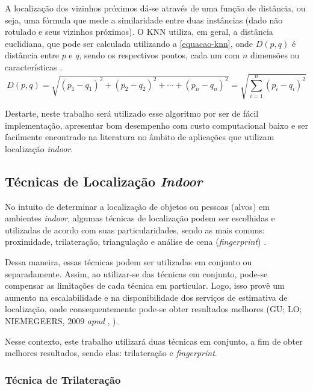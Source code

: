 \documentclass[12pt]{artigoifce}
\begin{document}
A localização dos vizinhos próximos dá-se através de uma função de distância, ou seja, uma fórmula que mede a similaridade entre duas instâncias (dado não rotulado e seus vizinhos próximos). O KNN utiliza, em geral, a distância euclidiana, que pode ser calculada utilizando a \autoref{equacao-knn}, onde $D(p,q)$ é distância entre $p$ e $q$, sendo os respectivos pontos, cada um com $n$ dimensões ou características \cite{tatsch2019}. 
\begin{equation}
    \label{equacao-knn}
    D(p,q) = \sqrt{(p_1-q_1)^2+(p_2-q_2)^2+\cdots+(p_n-q_n)^2} = \sqrt{\sum_{i=1}^{n} \left(p_i-q_i\right)^2}
\end{equation}

Destarte, neste trabalho será utilizado esse algoritmo por ser de fácil implementação, apresentar bom desempenho com custo computacional baixo e ser facilmente encontrado na literatura no âmbito de aplicações que utilizam localização \textit{indoor}. 

\subsection{Técnicas de Localização \textit{Indoor}}
\label{sec-fundamentacao-localizacao-indoor}

No intuito de determinar a localização de objetos ou pessoas (alvos) em ambientes \textit{indoor}, algumas técnicas de localização podem ser escolhidas e utilizadas de acordo com suas particularidades, sendo as mais comuns: proximidade, trilateração, triangulação e análise de cena (\textit{fingerprint}) \cite{berz2015, barros2016}.

Dessa maneira, essas técnicas podem ser utilizadas em conjunto ou separadamente. Assim, ao utilizar-se das técnicas em conjunto, pode-se compensar as limitações de cada técnica em particular. Logo, isso provê um aumento na escalabilidade e na disponibilidade dos serviços de estimativa de localização, onde consequentemente pode-se obter resultados melhores (GU; LO; NIEMEGEERS, 2009 \textit{apud} \citeauthor{reck2016}, \citeyear{reck2016}).  

Nesse contexto, este trabalho utilizará duas técnicas em conjunto, a fim de  obter melhores resultados, sendo elas: trilateração e \textit{fingerprint}.


\subsubsection{Técnica de Trilateração}
\label{sec-fundamentacao-trilateracao}
\end{document}
